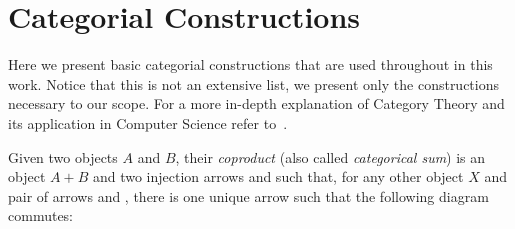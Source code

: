 \section{Categorial Constructions}

Here we present basic categorial constructions that are used throughout in this work. Notice that this is not an extensive list, we present only the constructions necessary to our scope. For a more in-depth explanation of Category Theory and its application in Computer Science refer to~\cite{Pierce1991}.

\begin{definition}[Coproduct] Given two objects $A$ and $B$, their \emph{coproduct} (also called \emph{categorical sum}) is an object $A+B$ and two injection arrows  and  such that, for any other object $X$ and pair of arrows  and , there is one unique arrow  such that the following diagram commutes:


\end{definition}

